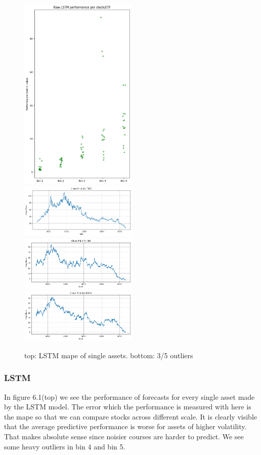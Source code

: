 \documentclass[a4paper,12pt]{report}
\begin{document}
\begin{figure}
  \includegraphics[width=0.5\textwidth]{images/results_LSTM.png}
  \includegraphics[width=0.5\textwidth]{images/outlier1.png}
  \includegraphics[width=0.5\textwidth]{images/outlier2.png}
  \includegraphics[width=0.5\textwidth]{images/outlier3.png}
  \caption{top: LSTM mape of single assets. bottom: 3/5 outliers }
  \label{fig:wrapped}
\end{figure}
		\subsubsection*{LSTM}
	In figure 6.1(top) we see the performance of forecasts for every single asset made by the LSTM model. The error which the performance is measured with here is the mape so that we can compare stocks across different scale. It is clearly visible that the average predictive performance is worse for assets of higher volatility. That makes absolute sense since noisier courses are harder to predict. We see some heavy outliers in bin 4 and bin 5. \\
	
\end{document}
